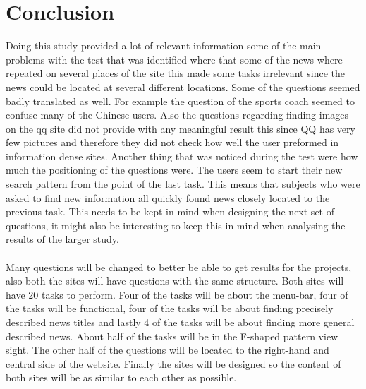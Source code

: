 \section{Conclusion}
Doing this study provided a lot of relevant information some of the main problems with the test that was identified where that some of the news where repeated on several places of the site this made some tasks irrelevant since the news could be located at several different locations. Some of the questions seemed badly translated as well. For example the question of the sports coach seemed to confuse many of the Chinese users. Also the questions regarding finding images on the qq site did not provide with any meaningful result this since QQ has very few pictures and therefore they did not check how well the user preformed in information dense sites. Another thing that was noticed during the test were how much the positioning of the questions were. The users seem to start their new search pattern from the point of the last task. This means that subjects who were asked to find new information all quickly found news closely located to the previous task. This needs to be kept in mind when designing the next set of questions, it might also be interesting to keep this in mind when analysing the results of the larger study.
\\\\
Many questions will be changed to better be able to get results for the projects, also both the sites will have questions with the same structure. Both sites will have 20 tasks to perform. Four of the tasks will be about the menu-bar, four of the tasks will be functional, four of the tasks will be about finding precisely described news titles and lastly 4 of the tasks will be about finding more general described news. About half of the tasks will be in the F-shaped pattern view sight. The other half of the questions will be located to the right-hand and central side of the website. Finally the sites will be designed so the content of both sites will be as similar to each other as possible. 

